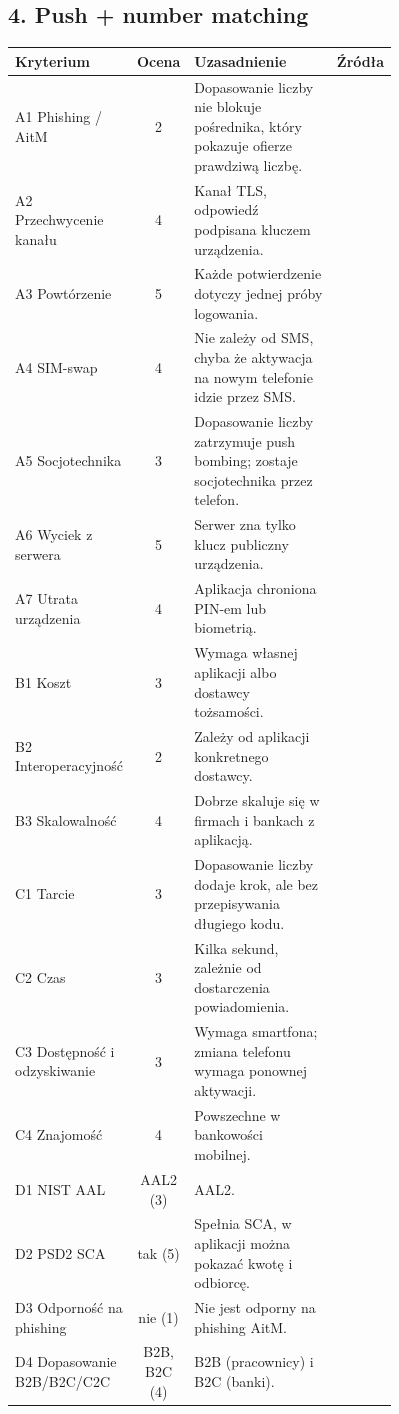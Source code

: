 \subsection*{4. Push + number matching}
\begingroup\small
\begin{longtable}{@{}p{0.2\linewidth}c p{0.56\linewidth}l@{}}
\toprule
Kryterium & Ocena & Uzasadnienie & Źródła \\
\midrule
\endhead
A1 Phishing / AitM & 2 & Dopasowanie liczby nie blokuje pośrednika, który pokazuje ofierze prawdziwą liczbę. & \cite{A1,X5} \\
A2 Przechwycenie kanału & 4 & Kanał TLS, odpowiedź podpisana kluczem urządzenia. & \cite{X9,P10} \\
A3 Powtórzenie & 5 & Każde potwierdzenie dotyczy jednej próby logowania. & \cite{X9} \\
A4 SIM-swap & 4 & Nie zależy od SMS, chyba że aktywacja na nowym telefonie idzie przez SMS. & \cite{P11,X5} \\
A5 Socjotechnika & 3 & Dopasowanie liczby zatrzymuje push bombing; zostaje socjotechnika przez telefon. & \cite{A2,X5,X9} \\
A6 Wyciek z serwera & 5 & Serwer zna tylko klucz publiczny urządzenia. & \cite{X9} \\
A7 Utrata urządzenia & 4 & Aplikacja chroniona PIN-em lub biometrią. & \cite{P10} \\
B1 Koszt & 3 & Wymaga własnej aplikacji albo dostawcy tożsamości. & \cite{P7,P10} \\
B2 Interoperacyjność & 2 & Zależy od aplikacji konkretnego dostawcy. & \cite{P10} \\
B3 Skalowalność & 4 & Dobrze skaluje się w firmach i bankach z aplikacją. & \cite{P10} \\
C1 Tarcie & 3 & Dopasowanie liczby dodaje krok, ale bez przepisywania długiego kodu. & \cite{X5,X9} \\
C2 Czas & 3 & Kilka sekund, zależnie od dostarczenia powiadomienia. & \cite{X9} \\
C3 Dostępność i odzyskiwanie & 3 & Wymaga smartfona; zmiana telefonu wymaga ponownej aktywacji. & \cite{P11} \\
C4 Znajomość & 4 & Powszechne w bankowości mobilnej. & \cite{P9} \\
D1 NIST AAL & AAL2 (3) & AAL2. & \cite{N1} \\
D2 PSD2 SCA & tak (5) & Spełnia SCA, w aplikacji można pokazać kwotę i odbiorcę. & \cite{N3} \\
D3 Odporność na phishing & nie (1) & Nie jest odporny na phishing AitM. & \cite{N1,X5} \\
D4 Dopasowanie B2B/B2C/C2C & B2B, B2C (4) & B2B (pracownicy) i B2C (banki). & \cite{P10,X9} \\
\bottomrule
\end{longtable}
\endgroup

